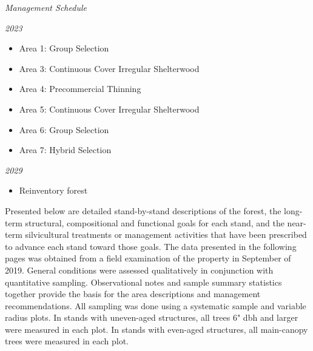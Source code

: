 \documentclass[]{tufte-handout}
\begin{document}
\begin{marginfigure} \noindent \textit{\LARGE Management Schedule} 

 \vspace{10 pt} 

 \noindent \textit{\large 2023} 

 \begin{itemize} \item Area 1: Group Selection 

 \item Area 3: Continuous Cover Irregular Shelterwood 

 \item Area 4: Precommercial Thinning 

 \item Area 5: Continuous Cover Irregular Shelterwood 

 \item Area 6: Group Selection 

 \item Area 7: Hybrid Selection 

 \end{itemize} \vspace{10 pt} 

 \noindent \textit{\large 2029} 

 \begin{itemize} \item Reinventory forest 

 \end{itemize} \end{marginfigure}

Presented below are detailed stand-by-stand descriptions of the forest,
the long-term structural, compositional and functional goals for each
stand, and the near-term silvicultural treatments or management
activities that have been prescribed to advance each stand toward those
goals. The data presented in the following pages was obtained from a
field examination of the property in September of 2019. General
conditions were assessed qualitatively in conjunction with quantitative
sampling. Observational notes and sample summary statistics together
provide the basis for the area descriptions and management
recommendations. All sampling was done using a systematic sample and
variable radius plots. In stands with uneven-aged structures, all trees
6" dbh and larger were measured in each plot. In stands with even-aged
structures, all main-canopy trees were measured in each plot.
\end{document}
